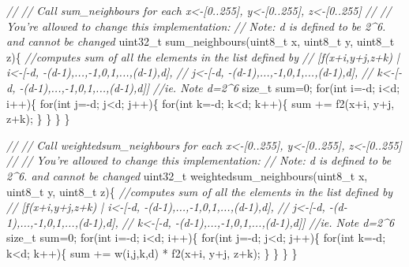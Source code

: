 \documentclass[]{article}
\newenvironment{Shaded}{}{}
\newcommand{\DataTypeTok}[1]{\textcolor[rgb]{0.50,0.00,0.00}{{#1}}}
\newcommand{\DecValTok}[1]{\textcolor[rgb]{0.00,0.00,1.00}{{#1}}}
\newcommand{\CommentTok}[1]{\textcolor[rgb]{0.50,0.50,0.50}{\textit{{#1}}}}
\newcommand{\ControlFlowTok}[1]{{#1}}
\newcommand{\NormalTok}[1]{{#1}}
\begin{document}
\begin{Shaded}
\begin{Highlighting}[]
        \CommentTok{//}
        \CommentTok{// Call sum_neighbours for each x<-[0..255], y<-[0..255], z<-[0..255]}
        \CommentTok{//}
        \CommentTok{// You're allowed to change this implementation: }
        \CommentTok{// Note: d is defined to be 2^6. and cannot be changed}
        \DataTypeTok{uint32_t} \NormalTok{sum_neighbours(}\DataTypeTok{uint8_t} \NormalTok{x, }\DataTypeTok{uint8_t} \NormalTok{y, }\DataTypeTok{uint8_t} \NormalTok{z)\{}
           \CommentTok{//computes sum of all the elements in the list defined by }
           \CommentTok{//       [f(x+i,y+j,z+k) | i<-[-d, -(d-1),...,-1,0,1,...,(d-1),d], }
           \CommentTok{//                         j<-[-d, -(d-1),...,-1,0,1,...,(d-1),d], }
           \CommentTok{//                         k<-[-d, -(d-1),...,-1,0,1,...,(d-1),d]]}
           \CommentTok{//ie.  Note d=2^6}
           \DataTypeTok{size_t} \NormalTok{sum=}\DecValTok{0}\NormalTok{;}
            \ControlFlowTok{for}\NormalTok{(}\DataTypeTok{int} \NormalTok{i=-d; i<d; i++)\{}
              \ControlFlowTok{for}\NormalTok{(}\DataTypeTok{int} \NormalTok{j=-d; j<d; j++)\{}
                 \ControlFlowTok{for}\NormalTok{(}\DataTypeTok{int} \NormalTok{k=-d; k<d; k++)\{}
                   \NormalTok{sum += f2(x+i, y+j, z+k);}
                 \NormalTok{\}}
              \NormalTok{\}}
            \NormalTok{\}}
        \NormalTok{\}}

        \CommentTok{//}
        \CommentTok{// Call weightedsum_neighbours for each x<-[0..255], y<-[0..255], z<-[0..255]}
        \CommentTok{//}
        \CommentTok{// You're allowed to change this implementation: }
        \CommentTok{// Note: d is defined to be 2^6. and cannot be changed}
        \DataTypeTok{uint32_t} \NormalTok{weightedsum_neighbours(}\DataTypeTok{uint8_t} \NormalTok{x, }\DataTypeTok{uint8_t} \NormalTok{y, }\DataTypeTok{uint8_t} \NormalTok{z)\{}
           \CommentTok{//computes sum of all the elements in the list defined by }
           \CommentTok{//       [f(x+i,y+j,z+k) | i<-[-d, -(d-1),...,-1,0,1,...,(d-1),d], }
           \CommentTok{//                         j<-[-d, -(d-1),...,-1,0,1,...,(d-1),d], }
           \CommentTok{//                         k<-[-d, -(d-1),...,-1,0,1,...,(d-1),d]]}
           \CommentTok{//ie.  Note d=2^6}
           \DataTypeTok{size_t} \NormalTok{sum=}\DecValTok{0}\NormalTok{;}
            \ControlFlowTok{for}\NormalTok{(}\DataTypeTok{int} \NormalTok{i=-d; i<d; i++)\{}
              \ControlFlowTok{for}\NormalTok{(}\DataTypeTok{int} \NormalTok{j=-d; j<d; j++)\{}
                 \ControlFlowTok{for}\NormalTok{(}\DataTypeTok{int} \NormalTok{k=-d; k<d; k++)\{}
                   \NormalTok{sum += w(i,j,k,d) * f2(x+i, y+j, z+k);}
                 \NormalTok{\}}
              \NormalTok{\}}
            \NormalTok{\}}
        \NormalTok{\}}


\end{Highlighting}
\end{Shaded}
\end{document}

